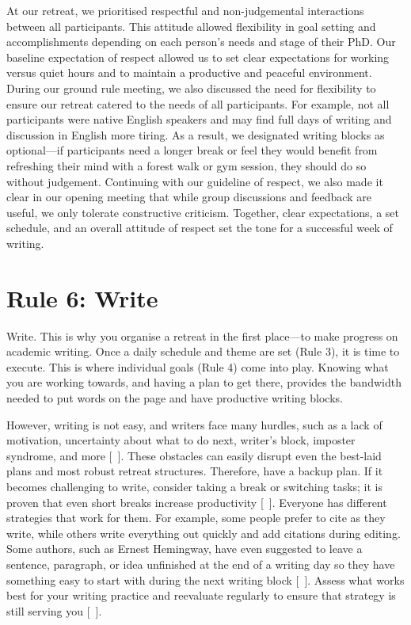 \documentclass[10pt,letterpaper]{article}
\begin{document}
At our retreat, we prioritised respectful and non-judgemental interactions between all participants. This attitude allowed flexibility in goal setting and accomplishments depending on each person's needs and stage of their PhD. Our baseline expectation of respect allowed us to set clear expectations for working versus quiet hours and to maintain a productive and peaceful environment. During our ground rule meeting, we also discussed the need for flexibility to ensure our retreat catered to the needs of all participants. For example, not all participants were native English speakers and may find full days of writing and discussion in English more tiring. As a result, we designated writing blocks as optional---if participants need a longer break or feel they would benefit from refreshing their mind with a forest walk or gym session, they should do so without judgement. Continuing with our guideline of respect, we also made it clear in our opening meeting that while group discussions and feedback are useful, we only tolerate constructive criticism. Together, clear expectations, a set schedule, and an overall attitude of respect set the tone for a successful week of writing.

\section*{Rule 6: Write}

Write. This is why you organise a retreat in the first place---to make progress on academic writing. Once a daily schedule and theme are set (Rule 3), it is time to execute. This is where individual goals (Rule 4) come into play. Knowing what you are working towards, and having a plan to get there, provides the bandwidth needed to put words on the page and have productive writing blocks.

However, writing is not easy, and writers face many hurdles, such as a lack of motivation, uncertainty about what to do next, writer's block, imposter syndrome, and more [~\cite{boice1984, murray2013, wilson2019, grogan2021}]. These obstacles can easily disrupt even the best-laid plans and most robust retreat structures. Therefore, have a backup plan. If it becomes challenging to write, consider taking a break or switching tasks; it is proven that even short breaks increase productivity [~\cite{carter2020, lyubykh2022}]. Everyone has different strategies that work for them. For example, some people prefer to cite as they write, while others write everything out quickly and add citations during editing. Some authors, such as Ernest Hemingway, have even suggested to leave a sentence, paragraph, or idea unfinished at the end of a writing day so they have something easy to start with during the next writing block [~\cite{hemingway1935}]. Assess what works best for your writing practice and reevaluate regularly to ensure that strategy is still serving you [~\cite{peterson2018, grogan2021}].
\end{document}
